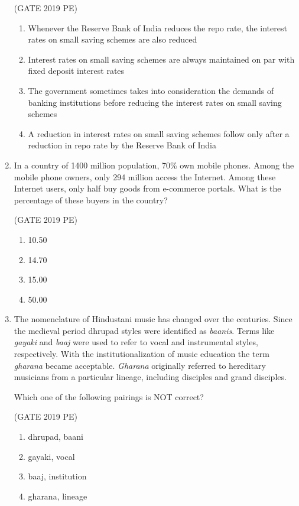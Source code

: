 \documentclass[journal,12pt,onecolumn]{exam}
\theoremstyle{remark}
\begin{document}
\begin{enumerate}
    \hfill{(GATE 2019 PE)}\\
    \begin{enumerate}
        \item Whenever the Reserve Bank of India reduces the repo rate, the interest rates on small saving schemes are also reduced
        \item Interest rates on small saving schemes are always maintained on par with fixed deposit interest rates
        \item The government sometimes takes into consideration the demands of banking institutions before reducing the interest rates on small saving schemes
        \item  A reduction in interest rates on small saving schemes follow only after a reduction in repo rate by the Reserve Bank of India
    \end{enumerate}
    

    \item In a country of 1400 million population, 70\% own mobile phones. Among the mobile phone owners, only 294 million access the Internet. Among these Internet users, only half buy goods from e-commerce portals. What is the percentage of these buyers in the country?

    \hfill{(GATE 2019 PE)}\\
    \begin{enumerate}
        \item 10.50
        \item 14.70
        \item 15.00
        \item 50.00
    \end{enumerate}
   

    \item The nomenclature of Hindustani music has changed over the centuries. Since the medieval period dhrupad styles were identified as \textit{baanis}. Terms like \textit{gayaki} and \textit{baaj} were used to refer to vocal and instrumental styles, respectively. With the institutionalization of music education the term \textit{gharana} became acceptable. \textit{Gharana} originally referred to hereditary musicians from a particular lineage, including disciples and grand disciples.

    Which one of the following pairings is NOT correct?
    
    \hfill{(GATE 2019 PE)}\\
    \begin{enumerate}
        \item dhrupad, baani
        \item gayaki, vocal
        \item baaj, institution
        \item gharana, lineage
    \end{enumerate}
    


\end{enumerate}
\end{document}
